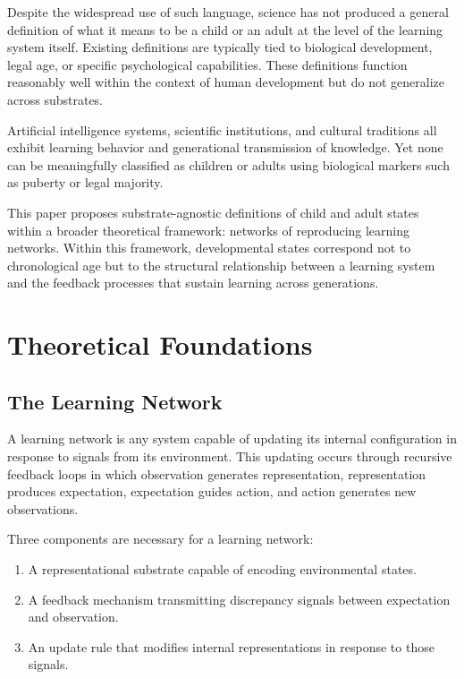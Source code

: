 \documentclass[11pt]{article}
\begin{document}
Despite the widespread use of such language, science has not produced a general definition of
what it means to be a child or an adult at the level of the learning system itself. Existing definitions
are typically tied to biological development, legal age, or specific psychological capabilities. These
definitions function reasonably well within the context of human development but do not generalize
across substrates.

Artificial intelligence systems, scientific institutions, and cultural traditions all exhibit learning
behavior and generational transmission of knowledge. Yet none can be meaningfully classified as
children or adults using biological markers such as puberty or legal majority.

This paper proposes substrate-agnostic definitions of child and adult states within a broader
theoretical framework: networks of reproducing learning networks. Within this framework,
developmental states correspond not to chronological age but to the structural relationship between
a learning system and the feedback processes that sustain learning across generations.

\section{Theoretical Foundations}

\subsection{The Learning Network}

A learning network is any system capable of updating its internal configuration in response to
signals from its environment. This updating occurs through recursive feedback loops in which
observation generates representation, representation produces expectation, expectation guides
action, and action generates new observations.

Three components are necessary for a learning network:

\begin{enumerate}
    \item A representational substrate capable of encoding environmental states.
    \item A feedback mechanism transmitting discrepancy signals between expectation and observation.
    \item An update rule that modifies internal representations in response to those signals.
\end{enumerate}
\end{document}

